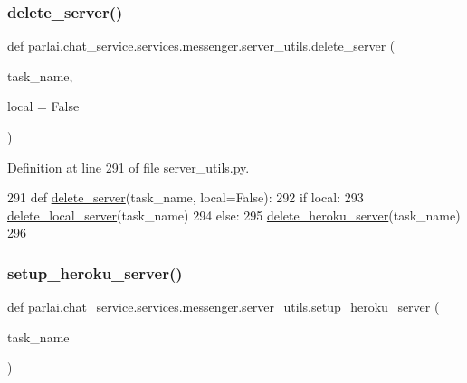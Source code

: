 \subsubsection{\texorpdfstring{delete\+\_\+server()}{delete\_server()}}
{\footnotesize\ttfamily def parlai.\+chat\+\_\+service.\+services.\+messenger.\+server\+\_\+utils.\+delete\+\_\+server (\begin{DoxyParamCaption}\item[{}]{task\+\_\+name,  }\item[{}]{local = {\ttfamily False} }\end{DoxyParamCaption})}



Definition at line 291 of file server\+\_\+utils.\+py.


\begin{DoxyCode}
291 \textcolor{keyword}{def }\hyperlink{namespaceparlai_1_1mturk_1_1core_1_1server__utils_a3c7c1d82bd4d26eb98ce9711de3cca7c}{delete\_server}(task\_name, local=False):
292     \textcolor{keywordflow}{if} local:
293         \hyperlink{namespaceparlai_1_1mturk_1_1core_1_1server__utils_a9b4f4c3f696be001c2fa96b3690af83c}{delete\_local\_server}(task\_name)
294     \textcolor{keywordflow}{else}:
295         \hyperlink{namespaceparlai_1_1mturk_1_1core_1_1server__utils_a8dfde882f9d6ff492ca565ae2334fc70}{delete\_heroku\_server}(task\_name)
296 \end{DoxyCode}
\mbox{\label{namespaceparlai_1_1chat__service_1_1services_1_1messenger_1_1server__utils_ad6686d06420159711f730caba7e82964}} 
\subsubsection{\texorpdfstring{setup\+\_\+heroku\+\_\+server()}{setup\_heroku\_server()}}
{\footnotesize\ttfamily def parlai.\+chat\+\_\+service.\+services.\+messenger.\+server\+\_\+utils.\+setup\+\_\+heroku\+\_\+server (\begin{DoxyParamCaption}\item[{}]{task\+\_\+name }\end{DoxyParamCaption})}



